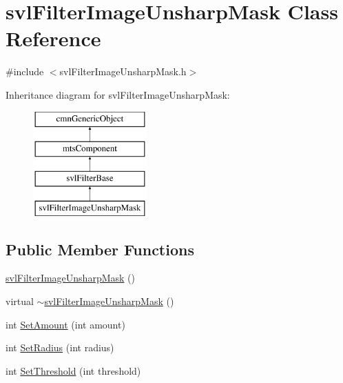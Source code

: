 \hypertarget{classsvl_filter_image_unsharp_mask}{\section{svl\-Filter\-Image\-Unsharp\-Mask Class Reference}
\label{classsvl_filter_image_unsharp_mask}
}


{\ttfamily \#include $<$svl\-Filter\-Image\-Unsharp\-Mask.\-h$>$}

Inheritance diagram for svl\-Filter\-Image\-Unsharp\-Mask\-:\begin{figure}[H]
\begin{center}
\leavevmode
\includegraphics[height=4.000000cm]{d4/d5e/classsvl_filter_image_unsharp_mask}
\end{center}
\end{figure}
\subsection*{Public Member Functions}
\begin{DoxyCompactItemize}
\item 
\hyperlink{classsvl_filter_image_unsharp_mask_a835a6b38cfbcb921532bff0bea061745}{svl\-Filter\-Image\-Unsharp\-Mask} ()
\item 
virtual \hyperlink{classsvl_filter_image_unsharp_mask_a9ffa23cfea44697712fbec7589e297cd}{$\sim$svl\-Filter\-Image\-Unsharp\-Mask} ()
\item 
int \hyperlink{classsvl_filter_image_unsharp_mask_a66c0f04c3711fdbae743fbe2a2d801cd}{Set\-Amount} (int amount)
\item 
int \hyperlink{classsvl_filter_image_unsharp_mask_af66f23e95bc343f9a7a03b7a7c5a5a95}{Set\-Radius} (int radius)
\item 
int \hyperlink{classsvl_filter_image_unsharp_mask_a87ec07638b714506a45acc97c05aa885}{Set\-Threshold} (int threshold)
\end{DoxyCompactItemize}
